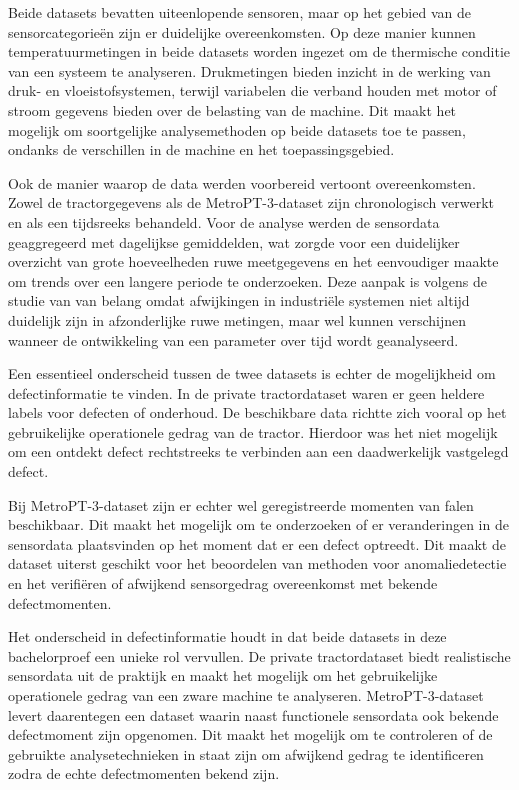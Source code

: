 Beide datasets bevatten uiteenlopende sensoren, maar op het gebied van de sensorcategorieën zijn er duidelijke overeenkomsten. Op deze manier kunnen temperatuurmetingen in beide datasets worden ingezet om de thermische conditie van een systeem te analyseren. Drukmetingen bieden inzicht in de werking van druk- en vloeistofsystemen, terwijl variabelen die verband houden met motor of stroom gegevens bieden over de belasting van de machine. Dit maakt het mogelijk om soortgelijke analysemethoden op beide datasets toe te passen, ondanks de verschillen in de machine en het toepassingsgebied.

Ook de manier waarop de data werden voorbereid vertoont overeenkomsten. Zowel de tractorgegevens als de MetroPT-3-dataset zijn chronologisch verwerkt en als een tijdsreeks behandeld. Voor de analyse werden de sensordata geaggregeerd met dagelijkse gemiddelden, wat zorgde voor een duidelijker overzicht van grote hoeveelheden ruwe meetgegevens en het eenvoudiger maakte om trends over een langere periode te onderzoeken. Deze aanpak is volgens de studie van \textcite{Dissem2024} van belang omdat afwijkingen in industriële systemen niet altijd duidelijk zijn in afzonderlijke ruwe metingen, maar wel kunnen verschijnen wanneer de ontwikkeling van een parameter over tijd wordt geanalyseerd.

Een essentieel onderscheid tussen de twee datasets is echter de mogelijkheid om defectinformatie te vinden. In de private tractordataset waren er geen heldere labels voor defecten of onderhoud. De beschikbare data richtte zich vooral op het gebruikelijke operationele gedrag van de tractor. Hierdoor was het niet mogelijk om een ontdekt defect rechtstreeks te verbinden aan een daadwerkelijk vastgelegd defect. 

Bij MetroPT-3-dataset zijn er echter wel geregistreerde momenten van falen beschikbaar. Dit maakt het mogelijk om te onderzoeken  of er veranderingen in de sensordata plaatsvinden op het moment dat er een defect optreedt. Dit maakt de dataset uiterst geschikt voor het beoordelen van methoden voor anomaliedetectie en het verifiëren of afwijkend sensorgedrag overeenkomst met bekende defectmomenten.

Het onderscheid in defectinformatie houdt in dat beide datasets in deze bachelorproef een unieke rol vervullen. De private tractordataset biedt realistische sensordata uit de praktijk en maakt het mogelijk om het gebruikelijke operationele gedrag van een zware machine te analyseren. MetroPT-3-dataset levert daarentegen een dataset waarin naast functionele sensordata ook bekende defectmoment zijn opgenomen. Dit maakt het mogelijk om te controleren of de gebruikte analysetechnieken in staat zijn om afwijkend gedrag te identificeren zodra de echte defectmomenten bekend zijn.

